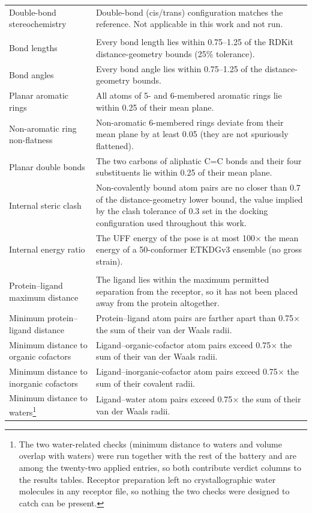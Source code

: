 \begin{longtable}[]{@{}
  >{\raggedright\arraybackslash}p{}
  >{\raggedright\arraybackslash}p{}@{}}
Double-bond stereochemistry & Double-bond (cis/trans) configuration matches the reference. Not applicable in this work and not run. \\
\multicolumn{2}{@{}l@{}}{%
\textbf{Intramolecular validity (ligand geometry and strain)}} \\
Bond lengths & Every bond length lies within 0.75--1.25 of the RDKit distance-geometry bounds (25\% tolerance). \\
Bond angles & Every bond angle lies within 0.75--1.25 of the distance-geometry bounds. \\
Planar aromatic rings & All atoms of 5- and 6-membered aromatic rings lie within 0.25\angstrom{} of their mean plane. \\
Non-aromatic ring non-flatness & Non-aromatic 6-membered rings deviate from their mean plane by at least 0.05\angstrom{} (they are not spuriously flattened). \\
Planar double bonds & The two carbons of aliphatic C=C bonds and their four substituents lie within 0.25\angstrom{} of their mean plane. \\
Internal steric clash & Non-covalently bound atom pairs are no closer than 0.7 of the distance-geometry lower bound, the value implied by the clash tolerance of 0.3 set in the docking configuration used throughout this work. \\
Internal energy ratio & The UFF energy of the pose is at most 100\ensuremath{\times} the mean energy of a 50-conformer ETKDGv3 ensemble (no gross strain). \\
\multicolumn{2}{@{}l@{}}{%
\textbf{Intermolecular validity (ligand versus receptor)}} \\
Protein--ligand maximum distance & The ligand lies within the maximum permitted separation from the receptor, so it has not been placed away from the protein altogether. \\
Minimum protein--ligand distance & Protein--ligand atom pairs are farther apart than 0.75\ensuremath{\times} the sum of their van der Waals radii. \\
Minimum distance to organic cofactors & Ligand--organic-cofactor atom pairs exceed 0.75\ensuremath{\times} the sum of their van der Waals radii. \\
Minimum distance to inorganic cofactors & Ligand--inorganic-cofactor atom pairs exceed 0.75\ensuremath{\times} the sum of their covalent radii. \\
Minimum distance to waters\footnote{The two water-related checks (minimum distance to waters and volume overlap with waters) were run together with the rest of the battery and are among the twenty-two applied entries, so both contribute verdict columns to the results tables. Receptor preparation left no crystallographic water molecules in any receptor file, so nothing the two checks were designed to catch can be present.} & Ligand--water atom pairs exceed 0.75\ensuremath{\times} the sum of their van der Waals radii. \\

\end{longtable}

